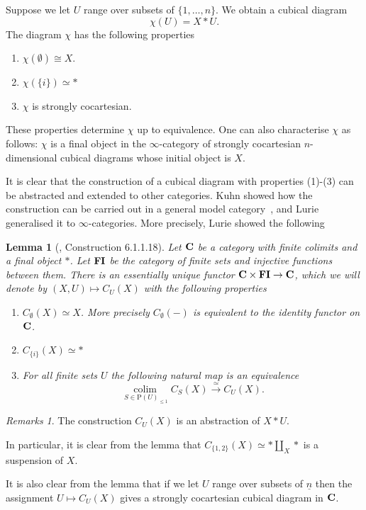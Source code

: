 \documentclass[psamsfonts]{amsart}
\theoremstyle{plain}
\newtheorem{lem}[thm]{Lemma}
\theoremstyle{definition}
\theoremstyle{remark}
\newtheorem{rems}[thm]{Remarks}
\newcommand{\catname}[1]{{\normalfont\textbf{#1}}}
\newcommand{\injfin}{\catname{FI}}
\newcommand{\power}{\mathrm{P}}
\DeclareMathOperator{\colim}{colim \,}
\begin{document}
Suppose we let $U$ range over subsets of $\{1, \ldots, n\}$. We obtain a cubical diagram
\[
\chi(U)=X*U.
\]
The diagram $\chi$ has the following properties
\begin{enumerate}
\item $\chi(\emptyset)\cong X$.
\item $\chi(\{i\})\simeq *$
\item $\chi$ is strongly cocartesian.
\end{enumerate}
These properties determine $\chi$ up to equivalence. One can also characterise $\chi$ as follows: $\chi$ is a final object in the $\infty$-category of strongly cocartesian $n$-dimensional cubical diagrams whose initial object is $X$.

It is clear that the construction of a cubical diagram with properties (1)-(3) can be abstracted and extended to other categories. Kuhn showed how the construction can be carried out in a general model category~\cite{Kuhn_2007}, and Lurie generalised it to $\infty$-categories. More precisely, Lurie showed the following
\begin{lem}[\cite{LurieHA}, Construction 6.1.1.18] \label{lemma: abstract join}
Let $\catname{C}$ be a category with finite colimits and a final object $*$. Let $\injfin$ be the category of finite sets and injective functions between them. There is an essentially unique functor $\catname{C}\times \injfin\to \catname{C}$, which we will denote by $(X, U)\mapsto C_U(X)$ with the following properties
\begin{enumerate}
\item $C_{\emptyset}(X)\simeq X$. More precisely $C_{\emptyset}(-)$ is equivalent to the identity functor on $\catname{C}$.
\item $C_{\{i\}}(X)\simeq *$
\item \label{eq:like join} For all finite sets $U$ the following natural map is an equivalence
\[
\underset{S\in \power(U)_{\le 1}}{\colim} C_S(X) \xrightarrow{\simeq} C_U(X).
\]
\end{enumerate}
\end{lem}
\begin{rems}
The construction $C_U(X)$ is an abstraction of $X*U$. 

In particular, it is clear from the lemma that $C_{\{1,2\}}(X)\simeq *\coprod_X *$ is a suspension of $X$.

It is also clear from the lemma that if we let $U$ range over subsets of $\underline{n}$ then the assignment $U\mapsto C_U(X)$ gives a strongly cocartesian cubical diagram in $\catname{C}$.
\end{rems}
\end{document}
